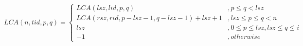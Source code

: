 \begin{figure*}[!thb]
  \normalsize
  \begin{equation}
    \mathit{LCA}(n, \mathit{tid}, p, q) = \begin{cases}
          \mathit{LCA}(\mathit{lsz}, \mathit{lid}, p, q) 
              &, p \le q < \mathit{lsz}\\ 
          \mathit{LCA}(\mathit{rsz}, \mathit{rid}, p-\mathit{lsz}-1, q-\mathit{lsz}-1)+\mathit{lsz}+1 
              &, \mathit{lsz} \le p \le q < n \\ 
          \mathit{lsz}
              &, 0 \le p \le \mathit{lsz}, \mathit{lsz} \le q \le i\\ 
          -1 
              &,\mathit{otherwise}
        \end{cases}
  \end{equation}
\end{figure*}